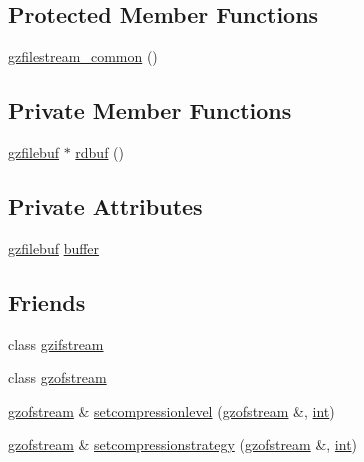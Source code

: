 \subsection*{Protected Member Functions}
\begin{DoxyCompactItemize}
\item 
\mbox{\hyperlink{classgzfilestream__common_a7b074883506c1f5f45638d6f4dbdb9d4}{gzfilestream\+\_\+common}} ()
\end{DoxyCompactItemize}
\subsection*{Private Member Functions}
\begin{DoxyCompactItemize}
\item 
\mbox{\hyperlink{classgzfilebuf}{gzfilebuf}} $\ast$ \mbox{\hyperlink{classgzfilestream__common_a91b5d674d0d3980e80d0b36594f8f3b0}{rdbuf}} ()
\end{DoxyCompactItemize}
\subsection*{Private Attributes}
\begin{DoxyCompactItemize}
\item 
\mbox{\hyperlink{classgzfilebuf}{gzfilebuf}} \mbox{\hyperlink{classgzfilestream__common_ac78c60664b72739806952289a9602d32}{buffer}}
\end{DoxyCompactItemize}
\subsection*{Friends}
\begin{DoxyCompactItemize}
\item 
class \mbox{\hyperlink{classgzfilestream__common_a8868b8b017f99a3546def94f45c13b9a}{gzifstream}}
\item 
class \mbox{\hyperlink{classgzfilestream__common_a6c603bc220f3120e5bbf9c04316ab930}{gzofstream}}
\item 
\mbox{\hyperlink{classgzofstream}{gzofstream}} \& \mbox{\hyperlink{classgzfilestream__common_a3351bd2cbcd5eedea805dfbf996f4236}{setcompressionlevel}} (\mbox{\hyperlink{classgzofstream}{gzofstream}} \&, \mbox{\hyperlink{ioapi_8h_a787fa3cf048117ba7123753c1e74fcd6}{int}})
\item 
\mbox{\hyperlink{classgzofstream}{gzofstream}} \& \mbox{\hyperlink{classgzfilestream__common_a37083e69bcbb72fd74685473a21eaa87}{setcompressionstrategy}} (\mbox{\hyperlink{classgzofstream}{gzofstream}} \&, \mbox{\hyperlink{ioapi_8h_a787fa3cf048117ba7123753c1e74fcd6}{int}})
\end{DoxyCompactItemize}


